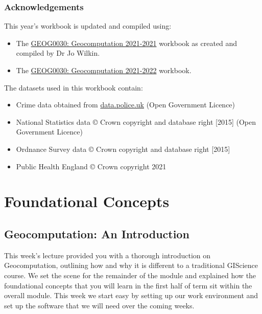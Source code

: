 \documentclass[
]{book}
\providecommand{\tightlist}{%
  \setlength{\itemsep}{0pt}\setlength{\parskip}{0pt}}
\begin{document}
\hypertarget{acknowledgements}{%
\section*{Acknowledgements}\label{acknowledgements}}

This year's workbook is updated and compiled using:

\begin{itemize}
\tightlist
\item
  The \href{https://jo-wilkin.github.io/GEOG0030/coursebook/index.html}{GEOG0030: Geocomputation 2021-2021} workbook as created and compiled by Dr Jo Wilkin.
\item
  The \href{https://jtvandijk.github.io/GEOG0030_20212022/}{GEOG0030: Geocomputation 2021-2022} workbook.
\end{itemize}

The datasets used in this workbook contain:

\begin{itemize}
\tightlist
\item
  Crime data obtained from \href{https://data.police.uk/}{data.police.uk} (Open Government Licence)
\item
  National Statistics data © Crown copyright and database right {[}2015{]} (Open Government Licence)
\item
  Ordnance Survey data © Crown copyright and database right {[}2015{]}
\item
  Public Health England © Crown copyright 2021
\end{itemize}

\hypertarget{part-foundational-concepts}{%
\part*{Foundational Concepts}\label{part-foundational-concepts}}

\hypertarget{geocomputation-an-introduction}{%
\chapter{Geocomputation: An Introduction}\label{geocomputation-an-introduction}}

This week's lecture provided you with a thorough introduction on Geocomputation, outlining how and why it is different to a traditional GIScience course. We set the scene for the remainder of the module and explained how the foundational concepts that you will learn in the first half of term sit within the overall module. This week we start easy by setting up our work environment and set up the software that we will need over the coming weeks.
\end{document}
